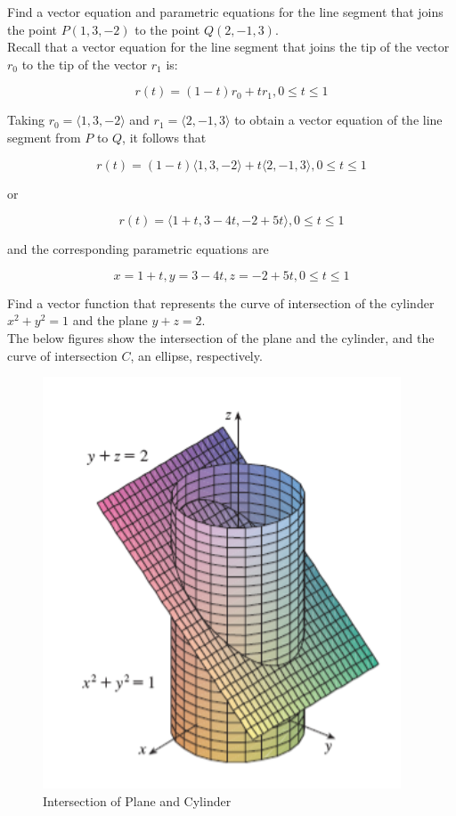         \textit{} Find a vector equation and parametric equations for the line segment that joins the point $P(1,3,-2)$ to the point $Q(2,-1,3)$. \\

        Recall that a vector equation for the line segment that joins the tip of the vector $r_0$ to the tip of the vector $r_1$ is:

        \[
            r(t) = (1-t) r_0 + tr_1, 0 \leq t \leq 1
        \]

        Taking $r_0 = \langle 1,3,-2\rangle$ and $r_1 = \langle 2, -1, 3\rangle$ to obtain a vector equation of the line segment from $P$ to $Q$, it follows that

        \[
            r(t) = (1-t)\langle 1,3,-2\rangle + t\langle 2, -1, 3\rangle, 0 \leq t\leq 1
        \]

        or

        \[
            r(t) = \langle 1 + t, 3-4t, -2 + 5t\rangle, 0 \leq t\leq 1
        \]

        and the corresponding parametric equations are

        \[
            x = 1+t, y = 3-4t, z = -2 + 5t, 0 \leq t \leq 1
        \]

        \textit{} Find a vector function that represents the curve of intersection of the cylinder $x^2 + y^2 = 1$ and the plane $y + z = 2$. \\

        The below figures show the intersection of the plane and the cylinder, and the curve of intersection $C$, an ellipse, respectively.

        \begin{figure}[hbt!]
            \centering
            \caption*{Intersection of Plane and Cylinder}
            \includegraphics[scale = 0.6]{Resources/13.1_Intersection_Plane_Cylinder}
        \end{figure}

